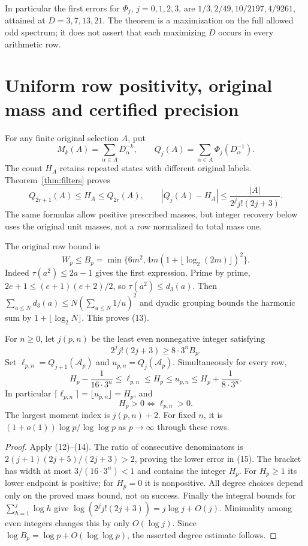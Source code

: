 In particular the first errors for $\Phi_j$, $j=0,1,2,3$, are
$1/3,2/49,10/2197,4/9261$, attained at $D=3,7,13,21$.
The theorem is a maximization on the full allowed odd spectrum; it does not
assert that each maximizing $D$ occurs in every arithmetic row.

\section{Uniform row positivity, original mass and certified precision}
For any finite original selection $A$, put
\[
 M_k(A)=\sum_{\alpha\in A}D_\alpha^{-k},\qquad
 Q_j(A)=\sum_{\alpha\in A}\Phi_j(D_\alpha^{-1}).
\]
The count $H_A$ retains repeated states with different original labels.
Theorem~\ref{thm:filters} proves
\[
 \boxed{Q_{2r+1}(A)\le H_A\le Q_{2r}(A),\qquad
 |Q_j(A)-H_A|\le\frac{|A|}{2^j j!(2j+3)}.}
 \tag{12}
\]
The same formulas allow positive prescribed masses, but integer recovery below
uses the original unit masses, not a row normalized to total mass one.

The original row bound is
\[
 W_p\le B_p=
 \min\{6m^2,4m(1+\lfloor\log_2(2m)\rfloor)^2\}.
 \tag{13}
\]
Indeed $\tau(a^2)\le2a-1$ gives the first expression. Prime by prime,
$2e+1\le(e+1)(e+2)/2$, so $\tau(a^2)\le d_3(a)$.
Then $\sum_{a\le N}d_3(a)\le N(\sum_{u\le N}1/u)^2$ and dyadic grouping
bounds the harmonic sum by $1+\lfloor\log_2N\rfloor$. This proves (13).

\begin{theorem}\label{thm:rows}
For $n\ge0$, let $j(p,n)$ be the least even nonnegative integer satisfying
\[
 2^j j!(2j+3)\ge8\cdot3^n B_p.
 \tag{14}
\]
Set $\ell_{p,n}=Q_{j+1}(\mathscr A_p)$ and
$u_{p,n}=Q_j(\mathscr A_p)$. Simultaneously for every row,
\[
 \boxed{H_p-\frac1{16\cdot3^n}\le\ell_{p,n}\le H_p
 \le u_{p,n}\le H_p+\frac1{8\cdot3^n}.}
 \tag{15}
\]
In particular $\lceil\ell_{p,n}\rceil=\lfloor u_{p,n}\rfloor=H_p$, and
\[
 \boxed{H_p>0\iff\ell_{p,n}>0.}
 \tag{16}
\]
The largest moment index is $j(p,n)+2$. For fixed $n$, it is
$(1+o(1))\log p/\log\log p$ as $p\to\infty$ through these rows.
\end{theorem}
\begin{proof}
Apply (12)--(14). The ratio of consecutive denominators is
$2(j+1)(2j+5)/(2j+3)>2$, proving the lower error in (15).
The bracket has width at most $3/(16\cdot3^n)<1$ and contains the integer $H_p$.
For $H_p\ge1$ its lower endpoint is positive; for $H_p=0$ it is nonpositive.
All degree choices depend only on the proved mass bound, not on success.
Finally the integral bounds for $\sum_{h=1}^j\log h$ give
$\log(2^j j!(2j+3))=j\log j+O(j)$. Minimality among even integers changes
this by only $O(\log j)$. Since $\log B_p=\log p+O(\log\log p)$,
the asserted degree estimate follows.
\end{proof}

